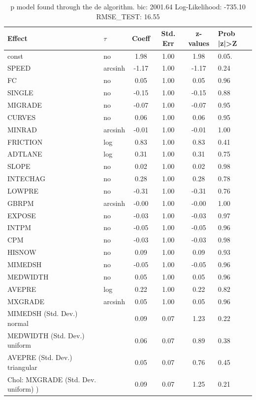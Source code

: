 \begin{table}
	\caption{p model found through the de algorithm. bic: 2001.64 Log-Likelihood: -735.10 RMSE_TEST: 16.55}
	\begin{center}
		\begin{tabular}{|l|l|c|c|c|l|}
			\hline
			Effect & $\tau$ & Coeff & Std. Err & z-values & Prob |z|>Z \\
			\hline
			const & no & 1.98 & 1.00 & 1.98 & 0.05. \\
			\hline
			SPEED & arcsinh & -1.17 & 1.00 & -1.17 & 0.24 \\
			\hline
			FC & no & 0.05 & 1.00 & 0.05 & 0.96 \\
			\hline
			SINGLE & no & -0.15 & 1.00 & -0.15 & 0.88 \\
			\hline
			MIGRADE & no & -0.07 & 1.00 & -0.07 & 0.95 \\
			\hline
			CURVES & no & 0.06 & 1.00 & 0.06 & 0.95 \\
			\hline
			MINRAD & arcsinh & -0.01 & 1.00 & -0.01 & 1.00 \\
			\hline
			FRICTION & log & 0.83 & 1.00 & 0.83 & 0.41 \\
			\hline
			ADTLANE & log & 0.31 & 1.00 & 0.31 & 0.75 \\
			\hline
			SLOPE & no & 0.02 & 1.00 & 0.02 & 0.98 \\
			\hline
			INTECHAG & no & 0.28 & 1.00 & 0.28 & 0.78 \\
			\hline
			LOWPRE & no & -0.31 & 1.00 & -0.31 & 0.76 \\
			\hline
			GBRPM & arcsinh & -0.00 & 1.00 & -0.00 & 1.00 \\
			\hline
			EXPOSE & no & -0.03 & 1.00 & -0.03 & 0.97 \\
			\hline
			INTPM & no & -0.05 & 1.00 & -0.05 & 0.96 \\
			\hline
			CPM & no & -0.03 & 1.00 & -0.03 & 0.98 \\
			\hline
			HISNOW & no & 0.09 & 1.00 & 0.09 & 0.93 \\
			\hline
			MIMEDSH & no & -0.05 & 1.00 & -0.05 & 0.96 \\
			\hline
			MEDWIDTH & no & 0.05 & 1.00 & 0.05 & 0.96 \\
			\hline
			AVEPRE & log & 0.22 & 1.00 & 0.22 & 0.82 \\
			\hline
			MXGRADE & arcsinh & 0.05 & 1.00 & 0.05 & 0.96 \\
			\hline
			MIMEDSH (Std. Dev.) normal &  & 0.09 & 0.07 & 1.23 & 0.22 \\
			\hline
			MEDWIDTH (Std. Dev.) uniform &  & 0.06 & 0.07 & 0.89 & 0.38 \\
			\hline
			AVEPRE (Std. Dev.) triangular &  & 0.05 & 0.07 & 0.76 & 0.45 \\
			\hline
			 Chol: MXGRADE (Std. Dev. uniform) ) &  & 0.09 & 0.07 & 1.25 & 0.21 \\
			\hline
		\end{tabular}
	\end{center}
\end{table}